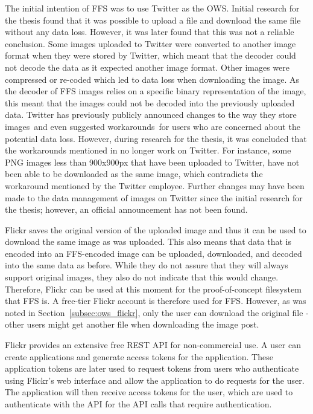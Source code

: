The initial intention of \gls{FFS} was to use Twitter as the \gls{OWS}. Initial research for the thesis found that it was possible to upload a file and download the same file without any data loss. However, it was later found that this was not a reliable conclusion. Some images uploaded to Twitter were converted to another image format when they were stored by Twitter, which meant that the decoder could not decode the data as it expected another image format. Other images were compressed or \mbox{re-coded} which led to data loss when downloading the image. As the decoder of \gls{FFS} images relies on a specific binary representation of the image, this meant that the images could not be decoded into the previously uploaded data. Twitter has previously publicly announced changes to the way they store images\,\cite{nolanobrienUpcomingChangesPNG2018} and even suggested workarounds\,\cite{nolanobrienFeedbackUpcomingChanges2019} for users who are concerned about the potential data loss. However, during research for the thesis, it was concluded that the workarounds mentioned in \cite{nolanobrienFeedbackUpcomingChanges2019} no longer work on Twitter. For instance, some PNG images less than 900x900px that have been uploaded to Twitter, have not been able to be downloaded as the same image, which contradicts the workaround mentioned by the Twitter employee. Further changes may have been made to the data management of images on Twitter since the initial research for the thesis; however, an official announcement has not been found.

Flickr saves the original version of the uploaded image and thus it can be used to download the same image as was uploaded. This also means that data that is encoded into an \gls{FFS}-encoded image can be uploaded, downloaded, and decoded into the same data as before. While they do not assure that they will always support original images, they also do not indicate that this would change. Therefore, Flickr can be used at this moment for the \mbox{proof-of-concept} filesystem that \gls{FFS} is. A \mbox{free-tier} Flickr account is therefore used for \gls{FFS}. However, as was noted in Section~\ref{subsec:ows_flickr}, only the user can download the original file - other users might get another file when downloading the image post. 

Flickr provides an extensive free REST \gls{API} for \mbox{non-commercial} use. A user can create applications and generate access tokens for the application. These application tokens are later used to request tokens from users who authenticate using Flickr's web interface and allow the application to do requests for the user. The application will then receive access tokens for the user, which are used to authenticate with the \gls{API} for the \gls{API} calls that require authentication.

